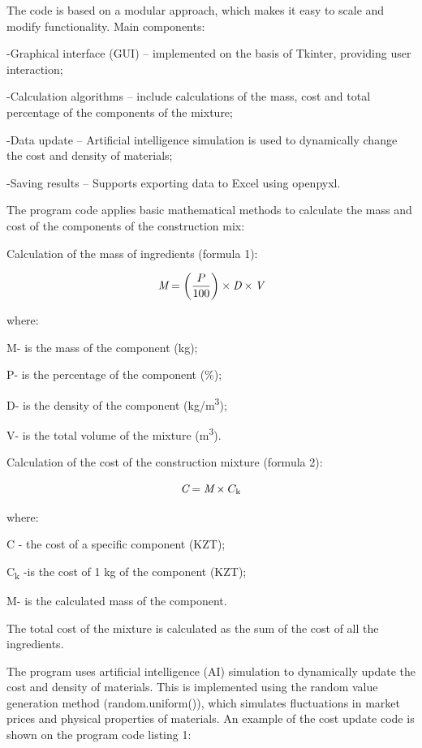 \begin{multicols}{2}
The code is based on a modular approach, which makes it easy to scale
and modify functionality. Main components:

-Graphical interface (GUI) -- implemented on the basis of Tkinter,
providing user interaction;

-Calculation algorithms -- include calculations of the mass, cost and
total percentage of the components of the mixture;

-Data update -- Artificial intelligence simulation is used to
dynamically change the cost and density of materials;

-Saving results -- Supports exporting data to Excel using openpyxl.

The program code applies basic mathematical methods to calculate the
mass and cost of the components of the construction mix:

Calculation of the mass of ingredients (formula 1):

\begin{equation}
\emph{M} = \left( \frac{P}{100} \right) \times \emph{D} \times \emph{V}
\end{equation}

where:

M- is the mass of the component (kg);

P- is the percentage of the component (\%);

D- is the density of the component (kg/m\textsuperscript{3});

V- is the total volume of the mixture (m\textsuperscript{3}).

Calculation of the cost of the construction mixture (formula 2):

\begin{equation}
\emph{C} = \emph{M} \times C_{\text{k}}
\end{equation}

where:

C - the cost of a specific component (KZT);

C\textsubscript{k} -is the cost of 1 kg of the component (KZT);

M- is the calculated mass of the component.

The total cost of the mixture is calculated as the sum of the cost of
all the ingredients.

The program uses artificial intelligence (AI) simulation to dynamically
update the cost and density of materials. This is implemented using the
random value generation method (random.uniform()), which simulates
fluctuations in market prices and physical properties of materials. An
example of the cost update code is shown on the program code listing 1:
\end{multicols}

